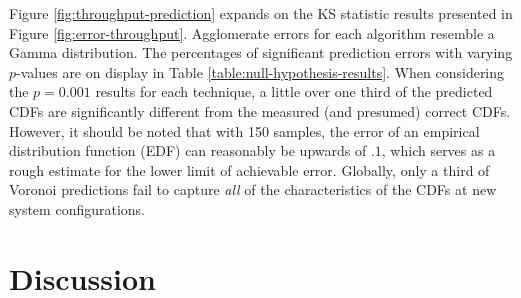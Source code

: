 \documentclass[smallextended,final]{svjour3}  %
\begin{document}

Figure \ref{fig:throughput-prediction} expands on the KS statistic
results presented in Figure \ref{fig:error-throughput}. Agglomerate
errors for each algorithm resemble a Gamma distribution. The
percentages of significant prediction errors with varying $p$-values
are on display in Table \ref{table:null-hypothesis-results}. When
considering the $p=0.001$ results for each technique, a little over
one third of the predicted CDFs are significantly different from the
measured (and presumed) correct CDFs. However, it should be noted that
with 150 samples, the error of an empirical distribution function
(EDF) can reasonably be upwards of $.1$, which serves as a rough
estimate for the lower limit of achievable error. Globally, only a
third of Voronoi predictions fail to capture \textit{all} of the
characteristics of the CDFs at new system configurations.

\section{Discussion}
\label{sec:discussion}
\end{document}
